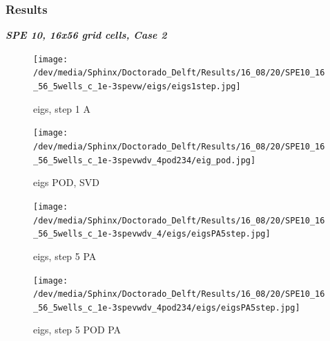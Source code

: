 \documentclass{beamer}
\begin{document}
\begin{frame}[shrink=10]
\frametitle{Results}

\emph{\textbf{SPE 10, 16x56 grid cells, Case 2}}\\
\begin{figure}
\centering
\begin{minipage}{.45\textwidth}
 \centering
\texttt{[image: /dev/media/Sphinx/Doctorado\_Delft/Results/16\_08/20/SPE10\_16\_56\_5wells\_c\_1e-3spevw/eigs/eigs1step.jpg]}
\caption{eigs, step 1 A}
\label{fig:compsol}
\end{minipage}%
\hspace{10mm}
\begin{minipage}{.45\textwidth}
 \centering
\texttt{[image: /dev/media/Sphinx/Doctorado\_Delft/Results/16\_08/20/SPE10\_16\_56\_5wells\_c\_1e-3spevwdv\_4pod234/eig\_pod.jpg]}
\caption{eigs POD, SVD}
\label{fig:NR_IC}
\end{minipage}
\end{figure}
\begin{figure}[!h]
\centering
\begin{minipage}{.4\textwidth}
 \centering
\texttt{[image: /dev/media/Sphinx/Doctorado\_Delft/Results/16\_08/20/SPE10\_16\_56\_5wells\_c\_1e-3spevwdv\_4/eigs/eigsPA5step.jpg]}
\caption{eigs, step 5 PA}
\label{fig:NR_D10}
\end{minipage}%
\hspace{15mm}
\begin{minipage}{.4\textwidth}
 \centering
\texttt{[image: /dev/media/Sphinx/Doctorado\_Delft/Results/16\_08/20/SPE10\_16\_56\_5wells\_c\_1e-3spevwdv\_4pod234/eigs/eigsPA5step.jpg]}
\caption{eigs, step 5 POD PA}
\label{fig:NR_POD5}
\end{minipage}
\end{figure}
\end{frame}
\end{document}
